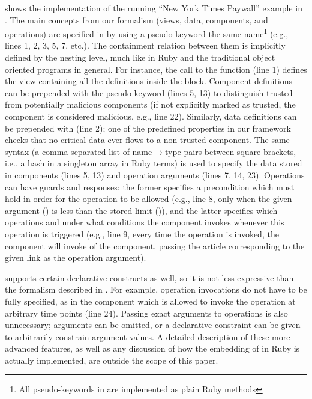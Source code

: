  shows the implementation of the running
``New York Times Paywall'' example in \sLang.  The main concepts from
our formalism (views, data, components, and operations) are specified
in \sLang by using a pseudo-keyword the same name\footnote{All
  pseudo-keywords in \sLang are implemented as plain Ruby methods}
(e.g., lines 1, 2, 3, 5, 7, etc.).  The containment relation between
them is implicitly defined by the nesting level, much like in Ruby and
the traditional object oriented programs in general.  For instance,
the call to the  function (line 1) defines the
 view containing all the definitions inside the
 block.  Component definitions can be prepended with
the  pseudo-keyword (lines 5, 13) to distinguish
trusted from potentially malicious components (if not explicitly
marked as trusted, the component is considered malicious, e.g., line
22).  Similarly, data definitions can be prepended with
 (line 2); one of the predefined properties in our
framework checks that no critical data ever flows to a non-trusted
component.  The same syntax (a comma-separated list of
name$\rightarrow$type pairs between square brackets, i.e., a hash in a
singleton array in Ruby terms) is used to specify the data stored in
components (lines 5, 13) and operation arguments (lines 7, 14, 23).
Operations can have guards and responses: the former specifies a
precondition which must hold in order for the operation to be allowed
(e.g., line 8, only when the given argument () is
less than the stored limit ()), and the latter specifies
which operations and under what conditions the component invokes
whenever this operation is triggered (e.g., line 9, every time the
 operation is invoked, the  component will
invoke  of the  component, passing the
article corresponding to the given link as the operation argument).

\sLang supports certain declarative constructs as well, so it is not
less expressive than the formalism described in
.  For example, operation invocations do not
have to be fully specified, as in the  component which is
allowed to invoke the  operation at arbitrary time
points (line 24).  Passing exact arguments to operations is also
unnecessary; arguments can be omitted, or a declarative constraint can
be given to arbitrarily constrain argument values.  A detailed
description of these more advanced features, as well as any discussion
of how the embedding of \sLang in Ruby is actually implemented, are
outside the scope of this paper.

